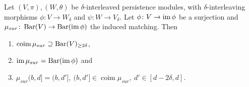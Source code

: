 \begin{lemma} \cite[Lemma 3.2.1]{polterovich}
    Let $ (V, \pi), (W, \theta) $ be $\delta$-interleaved persistence modules, with $\delta$-inter\-leaving morphisms $ \phi\colon V \to W_\delta $ and $ \psi\colon W \to V_\delta $. Let $ \phi\colon V \to \operatorname{im}\phi $ be a surjection and $ \mu_{sur}\colon \operatorname{Bar}(V) \to \operatorname{Bar} (\operatorname{im} \phi)$ the induced matching. Then
    \begin{enumerate}
        \item $\operatorname{coim} \mu_{sur} \supseteq \operatorname{Bar} (V)_{\geq 2\delta} $,
        \item $ \operatorname{im} \mu_{sur} = \operatorname{Bar} (\operatorname{im} \phi)$ and \label{}
        \item $ \mu_{sur}(b, d] = (b, d'], \ (b, d'] \in \operatorname{coim} \mu_{sur}, \ d' \in [d-2\delta, d]$.
    \end{enumerate}
\end{lemma}
